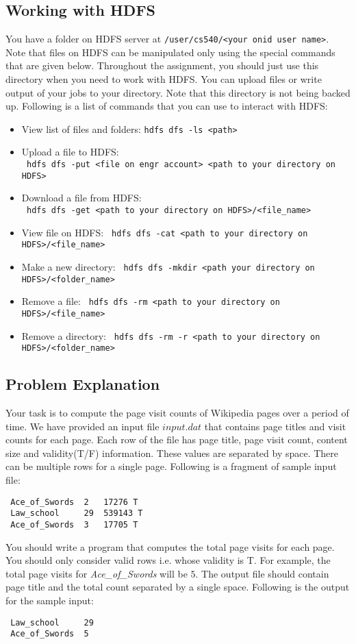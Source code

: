 \documentclass[11pt]{article}
\begin{document}
\subsection*{Working with HDFS}
You have a folder on HDFS server at \verb|/user/cs540/<your onid user name>|. Note that files on HDFS can be manipulated only using the special commands that are given below. Throughout the assignment, you should just use this directory when you need to work with HDFS. You can upload files or write output of your jobs to your directory. Note that this directory is not being backed up. Following is a list of commands that you can use to interact with HDFS: 
\begin{itemize}
 \item View list of files and folders: \verb|hdfs dfs -ls <path>|
 \item Upload a file to HDFS: \\
 \verb| hdfs dfs -put <file on engr account> <path to your directory on HDFS>|
 \item Download a file from HDFS: \\
 \verb| hdfs dfs -get <path to your directory on HDFS>/<file_name> |
 \item View file on HDFS: \verb| hdfs dfs -cat <path to your directory on HDFS>/<file_name> |
 \item Make a new directory: \verb| hdfs dfs -mkdir <path your directory on HDFS>/<folder_name> |
 \item Remove a file: \verb| hdfs dfs -rm <path to your directory on HDFS>/<file_name> |
 \item Remove a directory: \verb| hdfs dfs -rm -r <path to your directory on HDFS>/<folder_name> |
\end{itemize}

\subsection*{Problem Explanation}
Your task is to compute the page visit counts of Wikipedia pages over a period of time. We have provided an input file $input.dat$ that contains page titles and visit counts for each page. Each row of the file has page title, page visit count, content size and validity(T/F) information. These values are separated by space. There can be multiple rows for a single page. Following is a fragment of sample input file:
\begin{verbatim}
 Ace_of_Swords	2	17276 T
 Law_school		29	539143 T
 Ace_of_Swords	3	17705 T
\end{verbatim}
\noindent You should write a program that computes the total page visits for each page. You should only consider valid rows i.e. whose validity is T. For example, the total page visits for \textit{Ace\_of\_Swords} will be $5$. The output file should contain page title and the total count separated by a single space. Following is the output for the sample input:
\begin{verbatim}
 Law_school		29 
 Ace_of_Swords	5	
\end{verbatim}
\end{document}
